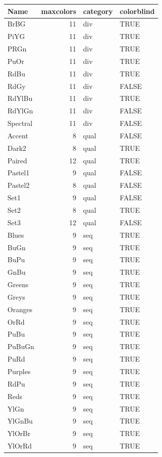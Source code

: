 \documentclass[12pt,]{book}
\newenvironment{Shaded}{\begin{snugshade}}{\end{snugshade}}
\newcommand{\KeywordTok}[1]{\textcolor[rgb]{0.13,0.29,0.53}{\textbf{{#1}}}}
\newcommand{\DataTypeTok}[1]{\textcolor[rgb]{0.13,0.29,0.53}{{#1}}}
\newcommand{\StringTok}[1]{\textcolor[rgb]{0.31,0.60,0.02}{{#1}}}
\newcommand{\NormalTok}[1]{{#1}}
\begin{document}
\begin{Shaded}
\end{Shaded}

\begin{tabular}{l|r|l|l}
\hline
Name & maxcolors & category & colorblind\\
\hline
BrBG & 11 & div & TRUE\\
\hline
PiYG & 11 & div & TRUE\\
\hline
PRGn & 11 & div & TRUE\\
\hline
PuOr & 11 & div & TRUE\\
\hline
RdBu & 11 & div & TRUE\\
\hline
RdGy & 11 & div & FALSE\\
\hline
RdYlBu & 11 & div & TRUE\\
\hline
RdYlGn & 11 & div & FALSE\\
\hline
Spectral & 11 & div & FALSE\\
\hline
Accent & 8 & qual & FALSE\\
\hline
Dark2 & 8 & qual & TRUE\\
\hline
Paired & 12 & qual & TRUE\\
\hline
Pastel1 & 9 & qual & FALSE\\
\hline
Pastel2 & 8 & qual & FALSE\\
\hline
Set1 & 9 & qual & FALSE\\
\hline
Set2 & 8 & qual & TRUE\\
\hline
Set3 & 12 & qual & FALSE\\
\hline
Blues & 9 & seq & TRUE\\
\hline
BuGn & 9 & seq & TRUE\\
\hline
BuPu & 9 & seq & TRUE\\
\hline
GnBu & 9 & seq & TRUE\\
\hline
Greens & 9 & seq & TRUE\\
\hline
Greys & 9 & seq & TRUE\\
\hline
Oranges & 9 & seq & TRUE\\
\hline
OrRd & 9 & seq & TRUE\\
\hline
PuBu & 9 & seq & TRUE\\
\hline
PuBuGn & 9 & seq & TRUE\\
\hline
PuRd & 9 & seq & TRUE\\
\hline
Purples & 9 & seq & TRUE\\
\hline
RdPu & 9 & seq & TRUE\\
\hline
Reds & 9 & seq & TRUE\\
\hline
YlGn & 9 & seq & TRUE\\
\hline
YlGnBu & 9 & seq & TRUE\\
\hline
YlOrBr & 9 & seq & TRUE\\
\hline
YlOrRd & 9 & seq & TRUE\\
\hline
\end{tabular}
\end{document}
